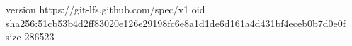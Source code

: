 version https://git-lfs.github.com/spec/v1
oid sha256:51cb53b4d2ff83020e126e29198fc6e8a1d1de6d161a4d431bf4eceb0b7d0e0f
size 286523
